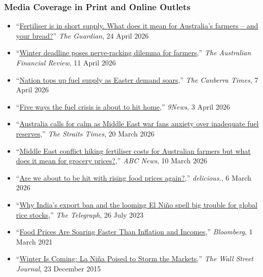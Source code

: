 \documentclass[10pt]{article}
\begin{document}
	\subsubsection*{Media Coverage in Print and Online Outlets} 
	\begin{itemize} 
		\item ``\href{https://www.theguardian.com/business/2026/apr/23/fertiliser-short-supply-australia-farmers-bread-prices-strait-of-hormuz}{Fertiliser is in short supply. What does it mean for Australia’s farmers – and your bread?}'' \textit{The Guardian}, 24 April 2026
		\item ``\href{https://www.afr.com/companies/agriculture/winter-deadline-poses-nerve-racking-dilemma-for-farmers-20260406-p5zlns}{Winter deadline poses nerve-racking dilemma for farmers},'' \textit{The Australian Financial Review}, 11 April 2026
		\item ``\href{https://www.canberratimes.com.au/story/9215181/nation-tops-up-fuel-supply-as-easter-demand-soars/}{Nation tops up fuel supply as Easter demand soars},'' \textit{The Canberra Times}, 7 April 2026 
		\item ``\href{https://www.9news.com.au/national/five-ways-the-fuel-crisis-is-about-to-hit-home/f052e047-39b5-4494-ba9c-fea253b7eeba}{Five ways the fuel crisis is about to hit home},'' \textit{9News}, 3 April 2026 
		\item  ``\href{https://www.straitstimes.com/asia/australianz/australia-calls-for-calm-as-middle-east-war-fans-anxiety-over-inadequate-fuel-reserves}{Australia calls for calm as Middle East war fans anxiety over inadequate fuel reserves},'' \textit{The Straits Times}, 20 March 2026
		\item ``\href{https://www.abc.net.au/news/2026-03-10/urea-fertiliser-shortage-hits-australian-farmers-iran-conflict/106433284}{Middle East conflict hiking fertiliser costs for Australian farmers but what does it mean for grocery prices?},'' \textit{ABC News}, 10 March 2026 
		\item ``\href{https://www.delicious.com.au/food-files/news-articles/article/could-middle-east-conflict-cause-rising-food-prices-australia/ksppsh8c}{Are we about to be hit with rising food prices again?},'' \textit{delicious.}, 6 March 2026
		\item ``\href{https://www.telegraph.co.uk/global-health/climate-and-people/india-rice-export-global-ban-food-security-shortsages/}{Why India’s export ban and the looming El Niño spell big trouble for global rice stocks},'' \textit{The Telegraph}, 26 July 2023 
		\item ``\href{https://www.bloomberg.com/news/articles/2021-03-01/inflation-2021-malnutrition-and-hunger-fears-rise-as-food-prices-soar-globally}{Food Prices Are Soaring Faster Than Inflation and Incomes},'' \textit{Bloomberg}, 1 March 2021 
		\item ``\href{https://www.wsj.com/articles/winter-is-coming-la-nina-poised-to-storm-the-markets-1450850704}{Winter Is Coming: La Niña Poised to Storm the Markets},'' \textit{The Wall Street Journal}, 23 December 2015  
	\end{itemize} 
	
\end{document}
